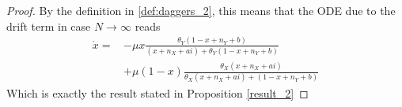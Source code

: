 \begin{proof}
	By the definition in \eqref{def:daggers_2}, this means that the ODE due to the drift term in case $N \rightarrow \infty$ reads 
	\begin{align*}
	\dot{x} = &-\mu x\frac{\theta_Y(1-x+n_Y+b)}{(x+n_X+ai) + \theta_Y(1-x+n_Y+b)}\\
		\qquad&+ \mu \left(1-x\right)\frac{\theta_X (x+ n_X+ ai)}{\theta_X (x + n_X + ai) + (1-x + n_Y + b)}
	\end{align*}
	Which is exactly the result stated in Proposition \ref{result_2}
\end{proof}